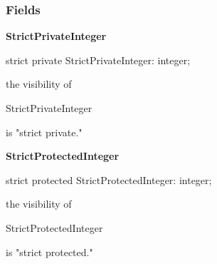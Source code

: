 \documentclass{report}
\newif\ifpdf
\begin{document}
\subsubsection*{\large{\textbf{Fields}}\normalsize\hspace{1ex}\hfill}
\begin{list}{}{
\setlength{\itemindent}{0cm}
\setlength{\listparindent}{0cm}
\setlength{\leftmargin}{\evensidemargin}
\addtolength{\leftmargin}{\tmplength}
\settowidth{\labelsep}{X}
\addtolength{\leftmargin}{\labelsep}
\setlength{\labelwidth}{\tmplength}
}
\label{ok_strict_visibilities.TStrictVisibility-StrictPrivateInteger}
\item[\textbf{StrictPrivateInteger}\hfill]
\ifpdf
\begin{flushleft}
\fi
\begin{ttfamily}
strict private StrictPrivateInteger: integer;\end{ttfamily}

\ifpdf
\end{flushleft}
\fi


\par the visibility of \begin{ttfamily}StrictPrivateInteger\end{ttfamily} is "strict private."\label{ok_strict_visibilities.TStrictVisibility-StrictProtectedInteger}
\item[\textbf{StrictProtectedInteger}\hfill]
\ifpdf
\begin{flushleft}
\fi
\begin{ttfamily}
strict protected StrictProtectedInteger: integer;\end{ttfamily}

\ifpdf
\end{flushleft}
\fi


\par the visibility of \begin{ttfamily}StrictProtectedInteger\end{ttfamily} is "strict protected."\end{list}
\end{document}

